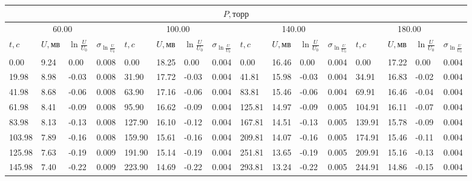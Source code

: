 \documentclass[a4paper,12pt]{article}
\begin{document}
\begin{enumerate}
\begin{table}
\begin{tabular}{|l|l|l|l|l|l|l|l|l|l|l|l|l|l|l|l|}
		\multicolumn{16}{|c|}{$P, торр$}                                                                                                                                                        \\ \hline
		\multicolumn{4}{|c|}{60.00}                 & \multicolumn{4}{c|}{100.00}                 & \multicolumn{4}{c|}{140.00}                 & \multicolumn{4}{c|}{180.00}                 \\ \hline
		$t,c$    & $U,мв$ & $\ln{\frac{U}{U_0}}$ & $\sigma_{\ln{\frac{U}{U_0}}}$ & $t,c$    & $U,мв$ & $\ln{\frac{U}{U_0}}$ & $\sigma_{\ln{\frac{U}{U_0}}} $& $t,c$    & $U,мв$ & $\ln{\frac{U}{U_0}}$ & $\sigma_{\ln{\frac{U}{U_0}}}$ & $t,c$    & $U,мв$ & $\ln{\frac{U}{U_0}}$ & $\sigma_{\ln{\frac{U}{U_0}}}$ \\ 
		\hline
		0.00   & 9.24   & 0.00     & 0.008          & 0.00   & 18.25  & 0.00     & 0.004          & 0.00   & 16.46  & 0.00     & 0.004          & 0.00   & 17.22  & 0.00     & 0.004          \\ \hline
		19.98  & 8.98   & -0.03    & 0.008          & 31.90  & 17.72  & -0.03    & 0.004          & 41.81  & 15.98  & -0.03    & 0.004          & 34.91  & 16.83  & -0.02    & 0.004          \\ \hline
		41.98  & 8.68   & -0.06    & 0.008          & 63.90  & 17.16  & -0.06    & 0.004          & 83.81  & 15.46  & -0.06    & 0.004          & 69.91  & 16.46  & -0.04    & 0.004          \\ \hline
		61.98  & 8.41   & -0.09    & 0.008          & 95.90  & 16.62  & -0.09    & 0.004          & 125.81 & 14.97  & -0.09    & 0.005          & 104.91 & 16.11  & -0.07    & 0.004          \\ \hline
		83.98  & 8.13   & -0.13    & 0.008          & 127.90 & 16.10  & -0.12    & 0.004          & 167.81 & 14.51  & -0.13    & 0.005          & 139.91 & 15.78  & -0.09    & 0.004          \\ \hline
		103.98 & 7.89   & -0.16    & 0.008          & 159.90 & 15.61  & -0.16    & 0.004          & 209.81 & 14.07  & -0.16    & 0.005          & 174.91 & 15.46  & -0.11    & 0.004          \\ \hline
		125.98 & 7.63   & -0.19    & 0.009          & 191.90 & 15.14  & -0.19    & 0.004          & 251.81 & 13.65  & -0.19    & 0.005          & 209.91 & 15.16  & -0.13    & 0.004          \\ \hline
		145.98 & 7.40   & -0.22    & 0.009          & 223.90 & 14.69  & -0.22    & 0.004          & 293.81 & 13.24  & -0.22    & 0.005          & 244.91 & 14.86  & -0.15    & 0.004          \\ \hline

\end{tabular}
\end{table}
\end{enumerate}
\end{document}
